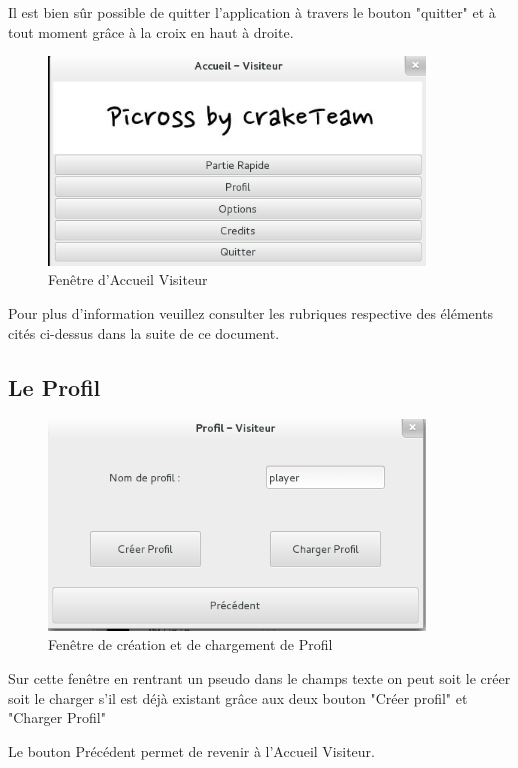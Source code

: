 \documentclass[11pt]{article}
\begin{document}
Il est bien sûr possible de quitter l'application à travers le bouton "quitter" et à tout moment grâce à la croix en haut à droite.

	\begin{figure}[!h]
		\centering
		\includegraphics[width=10cm]{./Screenshot/AccueilVisiteur.png}
		\caption{Fenêtre d'Accueil Visiteur}
	\end{figure}

Pour plus d'information veuillez consulter les rubriques respective des éléments cités ci-dessus dans la suite de ce document.

\newpage

\subsection{Le Profil}

	\begin{figure}[!ht]
		\centering
		\includegraphics[width=10cm]{./Screenshot/Profil.png}
		\caption{Fenêtre de création et de chargement de Profil}
	\end{figure}

Sur cette fenêtre en rentrant un pseudo dans le champs texte on peut soit le créer soit le charger s'il est déjà existant grâce aux deux bouton "Créer profil" et "Charger Profil"

Le bouton Précédent permet de revenir à l'Accueil Visiteur.	
\end{document}
